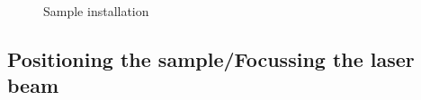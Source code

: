 \documentclass[14pt,a4paper] {article}
\begin{document}
\begin{figure}
\begin{minipage}[h]{0.5\linewidth}
\end{minipage}
\hfill
\begin{minipage}[h]{0.5\linewidth}
\end{minipage}
\caption{Sample installation}
\label{fig:sampleInstall}
\end{figure}




\subsection{Positioning the sample/Focussing the laser beam}
\end{document}
